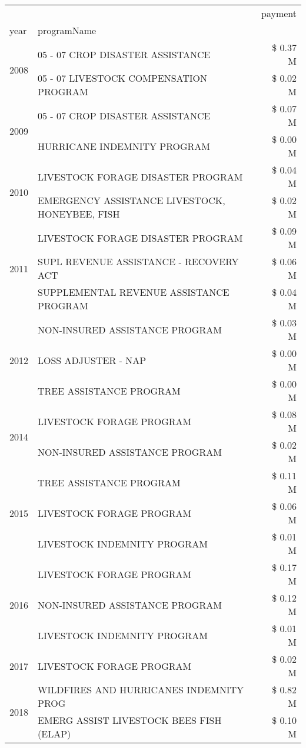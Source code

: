 \begin{tabular}{llr}
\toprule
 &  & payment \\
year & programName &  \\
\midrule
\multirow[t]{2}{*}{2008} & 05 - 07 CROP DISASTER ASSISTANCE & \$ 0.37 M \\
 & 05 - 07 LIVESTOCK COMPENSATION PROGRAM & \$ 0.02 M \\
\cline{1-3}
\multirow[t]{2}{*}{2009} & 05 - 07 CROP DISASTER ASSISTANCE & \$ 0.07 M \\
 & HURRICANE INDEMNITY PROGRAM & \$ 0.00 M \\
\cline{1-3}
\multirow[t]{2}{*}{2010} & LIVESTOCK FORAGE DISASTER  PROGRAM & \$ 0.04 M \\
 & EMERGENCY ASSISTANCE LIVESTOCK, HONEYBEE, FISH & \$ 0.02 M \\
\cline{1-3}
\multirow[t]{3}{*}{2011} & LIVESTOCK FORAGE DISASTER PROGRAM & \$ 0.09 M \\
 & SUPL REVENUE ASSISTANCE - RECOVERY ACT & \$ 0.06 M \\
 & SUPPLEMENTAL REVENUE ASSISTANCE PROGRAM & \$ 0.04 M \\
\cline{1-3}
\multirow[t]{3}{*}{2012} & NON-INSURED ASSISTANCE PROGRAM & \$ 0.03 M \\
 & LOSS ADJUSTER - NAP & \$ 0.00 M \\
 & TREE ASSISTANCE PROGRAM & \$ 0.00 M \\
\cline{1-3}
\multirow[t]{2}{*}{2014} & LIVESTOCK FORAGE PROGRAM & \$ 0.08 M \\
 & NON-INSURED ASSISTANCE PROGRAM & \$ 0.02 M \\
\cline{1-3}
\multirow[t]{3}{*}{2015} & TREE ASSISTANCE PROGRAM & \$ 0.11 M \\
 & LIVESTOCK FORAGE PROGRAM & \$ 0.06 M \\
 & LIVESTOCK INDEMNITY PROGRAM & \$ 0.01 M \\
\cline{1-3}
\multirow[t]{3}{*}{2016} & LIVESTOCK FORAGE PROGRAM                      & \$ 0.17 M \\
 & NON-INSURED ASSISTANCE PROGRAM                & \$ 0.12 M \\
 & LIVESTOCK INDEMNITY PROGRAM                   & \$ 0.01 M \\
\cline{1-3}
2017 & LIVESTOCK FORAGE PROGRAM & \$ 0.02 M \\
\cline{1-3}
\multirow[t]{3}{*}{2018} & WILDFIRES AND HURRICANES INDEMNITY PROG & \$ 0.82 M \\
 & EMERG ASSIST LIVESTOCK BEES FISH (ELAP) & \$ 0.10 M \\

\end{tabular}
